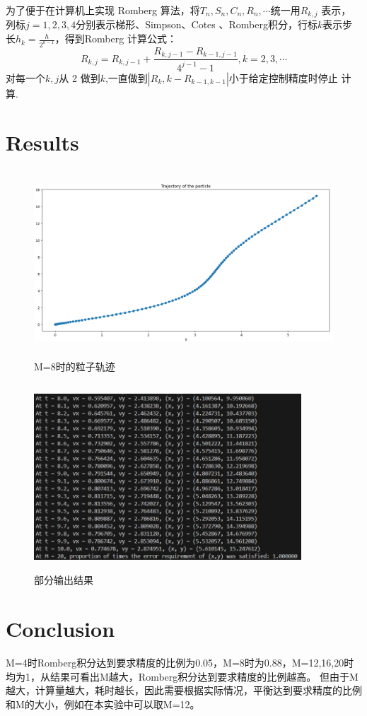 \documentclass{ctexart}
\begin{document}
为了便于在计算机上实现 Romberg 算法，将$T_n,S_n,C_n,R_n,\cdots$统一用$R_{k,j}$ 表示，
列标$j=1,2,3,4$分别表示梯形、Simpson、Cotes 、Romberg积分，行标$k$表示步长$h_k=\frac h{2^{k-1}}$，得到Romberg 计算公式：
$$R_{k,j}=R_{k,j-1}+\frac{R_{k,j-1}-R_{k-1,j-1}}{4^{j-1}-1},k=2,3,\cdots $$
对每一个$k,j$从 2 做到$k$,一直做到$|R_k,k-R_{k-1,k-1}|$小于给定控制精度时停止
计算.
	\section{Results}
	\begin{figure}[H]
		\centering 
		\includegraphics[height=7cm,width=14cm]{1.png}
		\caption{M=8时的粒子轨迹}
		\end{figure}
		\begin{figure}[H]
			\centering 
			\includegraphics[height=7cm,width=10cm]{2.png}
			\caption{部分输出结果}
			\end{figure}
			
		\section{Conclusion}
		M=4时Romberg积分达到要求精度的比例为0.05，M=8时为0.88，M=12,16,20时均为1，从结果可看出M越大，Romberg积分达到要求精度的比例越高。
		但由于M越大，计算量越大，耗时越长，因此需要根据实际情况，平衡达到要求精度的比例和M的大小，例如在本实验中可以取M=12。

    
\end{document}
